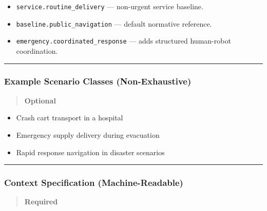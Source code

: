 \documentclass[utf8]{frontiers_suppmat} %
\providecommand{\tightlist}{%
  \setlength{\itemsep}{0pt}\setlength{\parskip}{0pt}}
\begin{document}
\begin{itemize}
\tightlist
\item
  \texttt{service.routine\_delivery} --- non-urgent service baseline.
\item
  \texttt{baseline.public\_navigation} --- default normative reference.
\item
  \texttt{emergency.coordinated\_response} --- adds structured
  human-robot coordination.
\end{itemize}

\begin{center}\rule{0.5\linewidth}{0.5pt}\end{center}

\subsubsection{Example Scenario Classes
(Non-Exhaustive)}\label{example-scenario-classes-non-exhaustive}

\begin{quote}
\textbf{Optional}
\end{quote}

\begin{itemize}
\tightlist
\item
  Crash cart transport in a hospital
\item
  Emergency supply delivery during evacuation
\item
  Rapid response navigation in disaster scenarios
\end{itemize}

\begin{center}\rule{0.5\linewidth}{0.5pt}\end{center}

\subsubsection{Context Specification
(Machine-Readable)}\label{context-specification-machine-readable}

\begin{quote}
\textbf{Required}
\end{quote}
\end{document}
